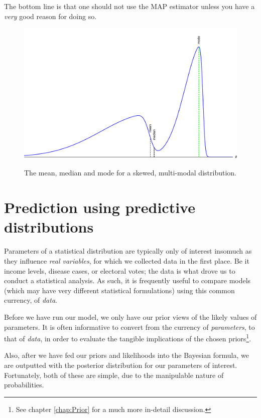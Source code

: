 \documentclass[11pt,fullpage]{book}
\begin{document}
The bottom line is that one should not use the MAP estimator unless you have a \textit{very} good reason for doing so. 

\begin{figure}
\centering
\scalebox{0.4} 
{\includegraphics{Posterior_meanMedianMAP.pdf}}
\caption{The mean, median and mode for a skewed, multi-modal distribution.}\label{fig:Posterior_meanMedianMAP}
\end{figure}


\section{Prediction using predictive distributions}\label{sec:Posterior_predictiveDistributions}
Parameters of a statistical distribution are typically only of interest insomuch as they influence \textit{real variables}, for which we collected data in the first place. Be it income levels, disease cases, or electoral votes; the data is what drove us to conduct a statistical analysis. As such, it is frequently useful to compare models (which may have very different statistical formulations) using this common currency, of \textit{data}.

Before we have run our model, we only have our prior views of the likely values of parameters. It is often informative to convert from the currency of \textit{parameters}, to that of \textit{data}, in order to evaluate the tangible implications of the chosen priors\footnote{See chapter \ref{chap:Prior} for a much more in-detail discussion.}.

Also, after we have fed our priors and likelihoods into the Bayesian formula, we are outputted with the posterior distribution for our parameters of interest. Fortunately, both of these are simple, due to the manipulable nature of probabilities.
\end{document}
